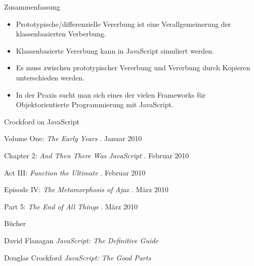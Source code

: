 \begin{frame}{Zusammenfassung}
  \begin{itemize}
    \item \alert{Prototypische/differenzielle Vererbung} ist eine \alert{Verallgemeinerung} der
      klassenbasierten Verberbung.
    \item \alert{Klassenbasierte Vererbung} kann in JavaScript \alert{simuliert} werden.
    \item Es muss zwischen \alert{prototypischer Vererbung} und \alert{Vererbung durch
      Kopieren} unterschieden werden.
    \item In der Praxis sucht man sich eines der \alert{vielen Frameworks} für
      \alert{Objektorientierte Programmierung mit JavaScript}.
  \end{itemize} 
\end{frame}

\begin{frame}{Crockford on JavaScript}
  \begin{thebibliography}{1}
     Volume One:
    \emph{The Early Years}
    . Januar 2010
    
     Chapter 2:
    \emph{And Then There Was JavaScript}
    . Februar 2010
    
     Act III:
    \emph{Function the Ultimate}
    . Februar 2010
    
     Episode IV:
    \emph{The Metamorphosis of Ajax}
    . März 2010
    
     Part 5:
    \emph{The End of All Things}
    . März 2010
    
  \end{thebibliography}
\end{frame}

\begin{frame}{Bücher}
  \begin{thebibliography}{1}
     David Flanagan
    \newblock \emph{JavaScript: The Definitive Guide}
    
     Douglas Crockford
    \newblock \emph{JavaScript: The Good Parts}
  \end{thebibliography}
\end{frame}

